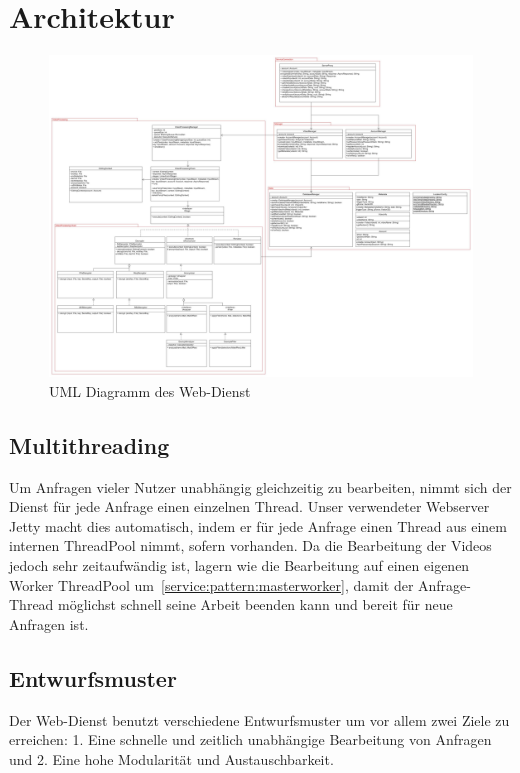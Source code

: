 \section{Architektur}

\begin{figure}[ht]
	\centering
\includegraphics[width=1\textwidth]{./resources/Diagramme/Webservice/UMLSERVERPCC.jpg}
\caption{UML Diagramm des Web-Dienst}
	\label{service:fig:modules_overview}
\end{figure}

\subsection{Multithreading}
Um Anfragen vieler Nutzer unabhängig gleichzeitig zu bearbeiten, nimmt sich der Dienst für jede Anfrage einen einzelnen Thread. Unser verwendeter Webserver Jetty macht dies automatisch, indem er für jede Anfrage einen Thread aus einem internen ThreadPool nimmt, sofern vorhanden.\newline
Da die Bearbeitung der Videos jedoch sehr zeitaufwändig ist, lagern wie die Bearbeitung auf einen eigenen Worker ThreadPool um~\eqref{service:pattern:masterworker}, damit der Anfrage-Thread möglichst schnell seine Arbeit beenden kann und bereit für neue Anfragen ist. 

\subsection{Entwurfsmuster} \label{service:pattern}
Der Web-Dienst benutzt verschiedene Entwurfsmuster um vor allem zwei Ziele zu erreichen: 1. Eine schnelle und zeitlich unabhängige Bearbeitung von Anfragen und 2. Eine hohe Modularität und Austauschbarkeit.

